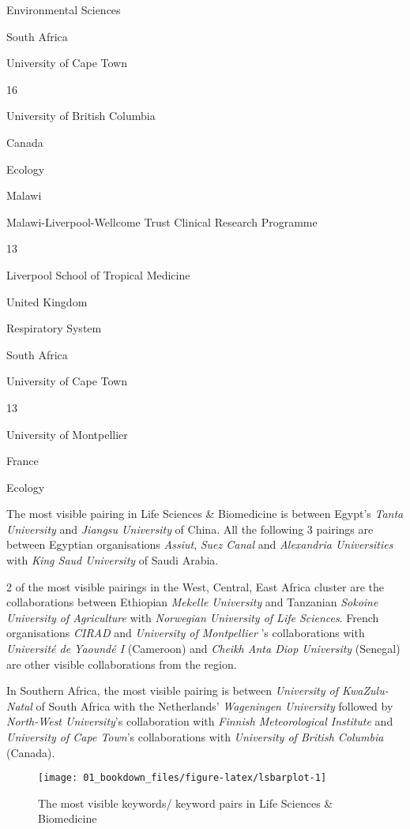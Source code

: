 \documentclass[12pt,twoside]{report}
\begin{document}
{Environmental Sciences }

{South Africa}

{University of Cape Town }

{16}

{University of British Columbia }

{Canada }

{Ecology }

{Malawi }

{Malawi-Liverpool-Wellcome Trust Clinical Research Programme}

{13}

{Liverpool School of Tropical Medicine}

{United Kingdom}

{Respiratory System }

{South Africa}

{University of Cape Town }

{13}

{University of Montpellier }

{France }

{Ecology }

The most visible pairing in Life Sciences \& Biomedicine is between Egypt's \emph{Tanta University} and \emph{Jiangsu University} of China. All the following 3 pairings are between Egyptian organisations \emph{Assiut}, \emph{Suez Canal} and \emph{Alexandria Universities} with \emph{King Saud University} of Saudi Arabia.

2 of the most visible pairings in the West, Central, East Africa cluster are the collaborations between Ethiopian \emph{Mekelle University} and Tanzanian \emph{Sokoine University of Agriculture} with \emph{Norwegian University of Life Sciences}. French organisations \emph{CIRAD} and \emph{University of Montpellier }'s collaborations with \emph{Université de Yaoundé I} (Cameroon) and \emph{Cheikh Anta Diop University} (Senegal) are other visible collaborations from the region.

In Southern Africa, the most visible pairing is between \emph{University of KwaZulu-Natal} of South Africa with the Netherlands' \emph{Wageningen University} followed by \emph{North-West University}'s collaboration with \emph{Finnish Meteorological Institute} and \emph{University of Cape Town}'s collaborations with \emph{University of British Columbia} (Canada).

\begin{figure}
\texttt{[image: 01\_bookdown\_files/figure-latex/lsbarplot-1]} \caption{The most visible keywords/ keyword pairs in Life Sciences & Biomedicine}\label{fig:lsbarplot}
\end{figure}
\end{document}
